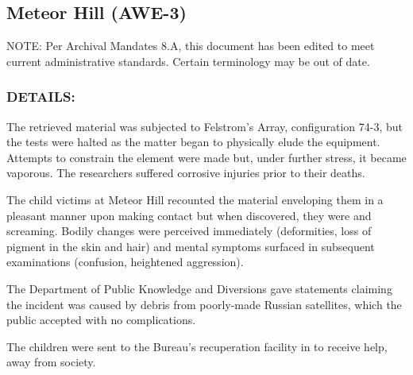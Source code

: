 \subsection*{Meteor Hill (AWE-3)}
\par NOTE: Per Archival Mandates 8.A, this document has been
edited to meet current administrative standards. Certain
terminology may be out of date.
\subsubsection*{DETAILS:}
\par The retrieved material was subjected to Felstrom's Array,
configuration 74-3, but the tests were halted as the matter began
to physically elude the equipment. Attempts to constrain the
element were made but, under further stress, it became vaporous.
The researchers suffered corrosive injuries prior to their deaths.
\par The child victims at Meteor Hill recounted the material enveloping
them in a pleasant manner upon making contact but when
discovered, they were 
and screaming. Bodily
changes were perceived immediately (deformities, loss of pigment
in the skin and hair) and mental symptoms surfaced in
subsequent examinations (confusion, heightened aggression).
\par The Department of Public Knowledge and Diversions gave
statements claiming the incident was caused by debris from
poorly-made Russian satellites, which the public accepted with no
complications.
\par The children were sent to the Bureau's recuperation facility in 
to receive help, away from society.